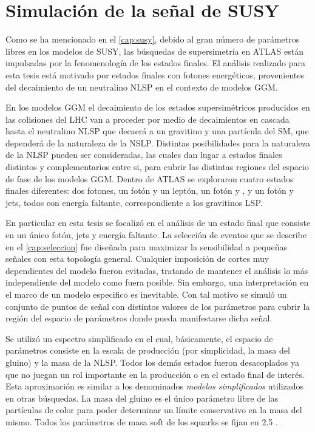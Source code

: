 \section{Simulación de la señal de SUSY}\label{sec:sig_samples}

Como se ha mencionado en el \cref{cap:susy}, debido al gran número de parámetros
libres en los modelos de SUSY, las búsquedas de supersimetría en ATLAS están
impulsadas por la fenomenología de los estados finales. El análisis realizado
para esta tesis está motivado por estados finales con fotones energéticos,
provenientes del decaimiento de un neutralino NLSP en el contexto de modelos
GGM.

En los modelos GGM el decaimiento de los estados supersimétricos producidos en
las colisiones del LHC van a proceder por medio de decaimientos en cascada hasta
el neutralino NLSP que decaerá a un gravitino y una partícula del SM, que
dependerá de la naturaleza de la NSLP. Distintas posibilidades para la
naturaleza de la NLSP pueden ser consideradas, las cuales dan lugar a estados
finales distintos y complementarios entre si, para cubrir las distintas regiones
del espacio de fase de los modelos GGM. Dentro de ATLAS se exploraron cuatro
estados finales diferentes: dos fotones, un fotón y un leptón, un fotón y
{\bjets}, y un fotón y jets, todos con energía faltante, correspondiente a los
gravitinos LSP.

En particular en esta tesis se focalizó en el análisis de un estado final que
consiste en un único fotón, jets y energía faltante.
La selección de eventos que se describe en el \cref{cap:seleccion} fue diseñada para
maximizar la sensibilidad a pequeñas señales con esta topología general.
Cualquier imposición de cortes muy dependientes del modelo fueron evitadas,
tratando de mantener el análisis lo más independiente del modelo como fuera
posible. Sin embargo, una interpretación en el marco de un modelo especifico es
inevitable. Con tal motivo se simuló un conjunto de puntos de señal con
distintos valores de los parámetros para cubrir la región del espacio de
parámetros donde pueda manifestarse dicha señal.


Se utilizó un espectro simplificado en el cual, básicamente, el espacio de
parámetros consiste en la escala de producción (por simplicidad, la masa del
gluino) y la masa de la NLSP. Todos los demás estados fueron desacoplados ya que
no juegan un rol importante en la producción o en el estado final de interés.
Esta aproximación es similar a los denominados \emph{modelos simplificados}
utilizados en otras búsquedas.
La masa del gluino es el único parámetro libre de las partículas de color para
poder determinar un límite conservativo en la masa del mismo. Todos los
parámetros de masa soft de los squarks se fijan en 2.5 \tev.

